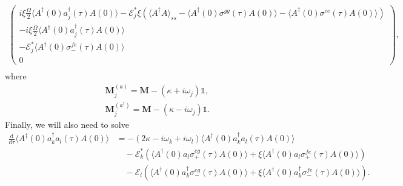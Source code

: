 \documentclass{article}
\newcommand{\ddtau}{\frac{\mathrm{d}}{\mathrm{d}\tau}}
\begin{document}
\begin{subequations}
\begin{align}
\begin{pmatrix}
			i \xi \frac{\Omega}{2} \langle A^{\dagger}(0) a_{j}^{\dagger}(\tau) A(0) \rangle - \mathcal{E}_{j}^{*} \xi \left( \langle A^{\dagger} A \rangle_{ss} - \langle A^{\dagger}(0) \sigma^{gg}(\tau) A(0) \rangle - \langle A^{\dagger}(0) \sigma^{ee}(\tau) A(0) \rangle \right) \\
			-i \xi \frac{\Omega}{2} \langle A^{\dagger}(0) a_{j}^{\dagger}(\tau) A(0) \rangle \\
			-\mathcal{E}_{j}^{*} \langle A^{\dagger}(0) \sigma^{fe}_{-}(\tau) A(0) \rangle \\
			0
		\end{pmatrix} , \\
	\end{align}
\end{subequations}
where
\begin{subequations}
	\begin{gather}
		\bm{M}_{j}^{(a)} = \bm{M} - \left( \kappa + i \omega_{j} \right) \mathbb{1}, \\
		\bm{M}_{j}^{(a^{\dagger})} = \bm{M} - \left( \kappa - i \omega_{j} \right) \mathbb{1}.
	\end{gather}
\end{subequations}
Finally, we will also need to solve
\begin{align}
	\ddtau \langle A^{\dagger}(0) a^{\dagger}_{k} a_{l}(\tau) A(0) \rangle &= -\left( 2 \kappa - i \omega_{k} + i \omega_{l} \right) \langle A^{\dagger}(0) a^{\dagger}_{k} a_{l}(\tau) A(0) \rangle \nonumber \\
	&\quad -\mathcal{E}_{k}^{*} \left( \langle A^{\dagger}(0) a_{l} \sigma^{eg}_{+}(\tau) A(0) \rangle + \xi \langle A^{\dagger}(0) a_{l} \sigma^{fe}_{+}(\tau) A(0) \rangle \right) \nonumber \\
	&\quad - \mathcal{E}_{l} \left( \langle A^{\dagger}(0) a_{k}^{\dagger} \sigma^{eg}_{-}(\tau) A(0) \rangle + \xi \langle A^{\dagger}(0) a_{k}^{\dagger} \sigma^{fe}_{-}(\tau) A(0) \rangle \right).
\end{align}
\end{document}

